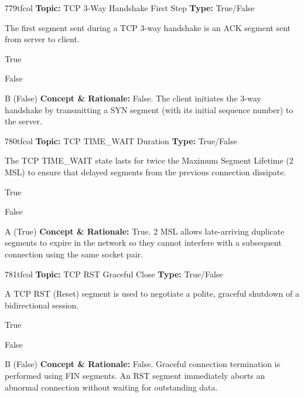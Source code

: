 \begin{qcard}{779}{tfcol}
\textcolor{darkslate!75}{\small\textbf{Topic:} TCP 3-Way Handshake First Step \hfill \textbf{Type:} True/False}\vspace{0.4em}\par
The first segment sent during a TCP 3-way handshake is an ACK segment sent from server to client.
\begin{qoptions}
\item True
\item False
\end{qoptions}
\end{qcard}
\nopagebreak
\begin{explainbox}{B (False)}
\textbf{Concept \& Rationale:} False. The client initiates the 3-way handshake by transmitting a SYN segment (with its initial sequence number) to the server.
\end{explainbox}

\begin{qcard}{780}{tfcol}
\textcolor{darkslate!75}{\small\textbf{Topic:} TCP TIME\_WAIT Duration \hfill \textbf{Type:} True/False}\vspace{0.4em}\par
The TCP TIME\_WAIT state lasts for twice the Maximum Segment Lifetime (2 MSL) to ensure that delayed segments from the previous connection dissipate.
\begin{qoptions}
\item True
\item False
\end{qoptions}
\end{qcard}
\nopagebreak
\begin{explainbox}{A (True)}
\textbf{Concept \& Rationale:} True. 2 MSL allows late-arriving duplicate segments to expire in the network so they cannot interfere with a subsequent connection using the same socket pair.
\end{explainbox}

\begin{qcard}{781}{tfcol}
\textcolor{darkslate!75}{\small\textbf{Topic:} TCP RST Graceful Close \hfill \textbf{Type:} True/False}\vspace{0.4em}\par
A TCP RST (Reset) segment is used to negotiate a polite, graceful shutdown of a bidirectional session.
\begin{qoptions}
\item True
\item False
\end{qoptions}
\end{qcard}
\nopagebreak
\begin{explainbox}{B (False)}
\textbf{Concept \& Rationale:} False. Graceful connection termination is performed using FIN segments. An RST segment immediately aborts an abnormal connection without waiting for outstanding data.
\end{explainbox}

